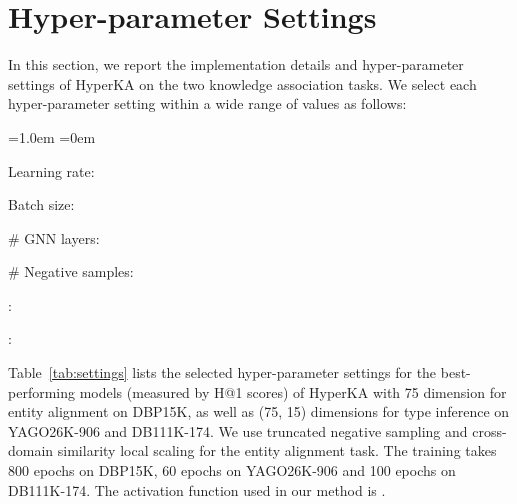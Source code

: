 \documentclass[11pt,a4paper]{article}
\newenvironment{noindlist}{
\begin{list}{\labelitemi}{
\leftmargin=1.0em 
\itemindent=0em 
\itemsep=2pt 
\parsep=1pt 
\parskip=1pt
}}{\end{list}}
\newcommand{\modelname}{HyperKA\xspace}
\begin{document}
\section{Hyper-parameter Settings}
\label{appendix:setting}
In this section, we report the implementation details and hyper-parameter settings of \modelname on the two knowledge association tasks. We select each hyper-parameter setting within a wide range of values as follows:

\begin{noindlist}
  \item Learning rate: 
  \item Batch size: 
  \item \# GNN layers: 
  \item \# Negative samples: 
  \item : 
  \item : 
\end{noindlist}

\noindent
Table~\ref{tab:settings} lists the selected hyper-parameter settings for the best-performing models (measured by H@1 scores) of \modelname with 75 dimension for entity alignment on DBP15K, as well as (75, 15) dimensions for type inference on YAGO26K-906 and DB111K-174. We use truncated negative sampling and cross-domain similarity local scaling for the entity alignment task. The training takes 800 epochs on DBP15K, 60 epochs on YAGO26K-906 and 100 epochs on DB111K-174. The activation function used in our method is .

\begin{table}[ht]
\centering
{}
\caption{Selected values for hyper-parameters.}
\label{tab:settings}
\end{table}
 
\end{document}
